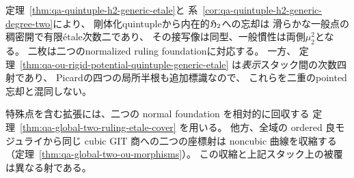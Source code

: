 \begin{remark}[一般二重被覆と大域のruling被覆]
\label{rem:qa-git-next-fiber}
定理~\ref{thm:qa-quintuple-h2-generic-etale}と
系~\ref{cor:qa-quintuple-h2-generic-degree-two}により、
剛体化quintupleから内在的$\mathfrak H_2$への忘却は
滑らかな一般点の稠密開で有限étale次数二であり、
その接写像は同型、一般慣性は両側$\mu_2^2$となる。
二枚は二つのnormalized ruling foundationに対応する。
一方、
定理~\ref{thm:qa-ou-rigid-potential-quintuple-generic-etale}
は\emph{表示}スタック間の次数四射であり、
Picardの四つの局所半根も追加標識なので、
これらを二重のpointed忘却と混同しない。

特殊点を含む拡張には、二つの normal foundation を相対的に回収する
定理~\ref{thm:qa-global-two-ruling-etale-cover} を用いる。
他方、全域の ordered 良モジュライから同じ cubic GIT 商への二つの座標射は
noncubic 曲線を収縮する（定理~\ref{thm:qa-global-two-ou-morphisms}）。
この収縮と上記スタック上の被覆は異なる射である。
\end{remark}

